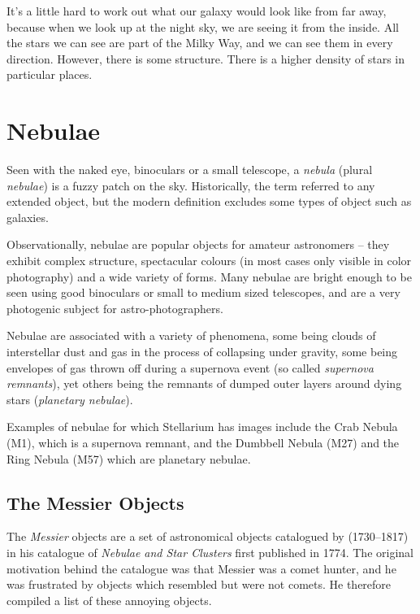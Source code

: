 It's a little hard to work out what our galaxy would look like from far
away, because when we look up at the night sky, we are seeing it from
the inside. All the stars we can see are part of the Milky Way, and we
can see them in every direction. However, there is some structure. There
is a higher density of stars in particular places.

\section{Nebulae}
\label{sec:Phenomena:Nebulae}

Seen with the naked eye, binoculars or a small telescope, a
\emph{nebula} (plural \emph{nebulae}) is a fuzzy patch on the sky.
Historically, the term referred to any extended object, but the modern
definition excludes some types of object such as galaxies.

Observationally, nebulae are popular objects for amateur astronomers
-- they exhibit complex structure, spectacular colours (in most cases
only visible in color photography) and a wide variety of forms. Many
nebulae are bright enough to be seen using good binoculars or small to
medium sized telescopes, and are a very photogenic subject for
astro-photographers.

Nebulae are associated with a variety of phenomena, some being clouds of
interstellar dust and gas in the process of collapsing under gravity,
some being envelopes of gas thrown off during a supernova event (so
called \emph{supernova remnants}), yet others being the remnants of
dumped outer layers around dying stars (\emph{planetary nebulae}).

Examples of nebulae for which Stellarium has images include the Crab
Nebula (M1), which is a supernova remnant, and the Dumbbell Nebula
(M27) and the Ring Nebula (M57) which are planetary nebulae.

\subsection{The Messier Objects}
\label{sec:Phenomena:Messier}

The \emph{Messier} objects are a set of astronomical objects catalogued
by  (1730--1817) in his catalogue of \emph{Nebulae and Star Clusters}
first published in 1774. The original motivation behind the catalogue
was that Messier was a comet hunter, and he was frustrated by objects which
resembled but were not comets. He therefore compiled a list of these annoying 
objects.

